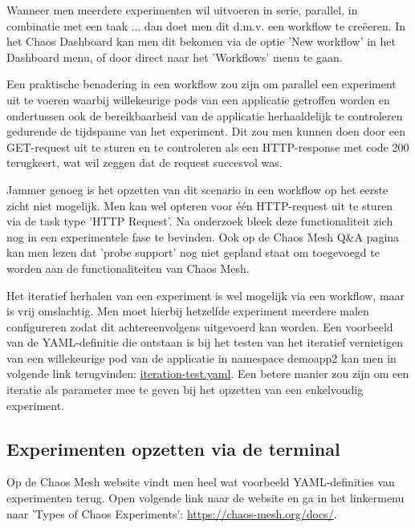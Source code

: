 Wanneer men meerdere experimenten wil uitvoeren in serie, parallel, in combinatie met een taak ... dan doet men dit d.m.v. een workflow te creëeren. In het Chaos Dashboard kan men dit bekomen via de optie 'New workflow' in het Dashboard menu, of door direct naar het 'Workflows' menu te gaan.

Een praktische benadering in een workflow zou zijn om parallel een experiment uit te voeren waarbij  willekeurige pods van een applicatie getroffen worden en ondertussen ook de bereikbaarheid van de applicatie herhaaldelijk te controleren gedurende de tijdspanne van het experiment. Dit zou men kunnen doen door een GET-request uit te sturen en te controleren als een HTTP-response met code 200 terugkeert, wat wil zeggen dat de request succesvol was. \autocite{MDN2022} 

Jammer genoeg is het opzetten van dit scenario in een workflow op het eerste zicht niet mogelijk. Men kan wel opteren voor één HTTP-request uit te sturen via de task type 'HTTP Request'. Na onderzoek bleek deze functionaliteit zich nog in een experimentele fase te bevinden. \autocite{ChaosMesh2022c}  
\newline Ook op de Chaos Mesh Q\&A pagina kan men lezen dat 'probe support' nog niet gepland staat om toegevoegd te worden aan de functionaliteiten van Chaos Mesh. \autocite{ChaosMesh2021}

Het iteratief herhalen van een experiment is wel mogelijk via een workflow, maar is vrij omslachtig. Men moet hierbij hetzelfde experiment meerdere malen configureren zodat dit achtereenvolgens uitgevoerd kan worden. Een voorbeeld van de YAML-definitie die ontstaan is bij het testen van het iteratief vernietigen van een willekeurige pod van de applicatie in namespace demoapp2 kan men in volgende link terugvinden: \href{https://github.com/KenBruggeman/BP_21-22/blob/master/bachelorproef/docs/chaosmesh-experimenten/iteration-test.yaml}{iteration-test.yaml}. \newline Een betere manier zou zijn om een iteratie als parameter mee te geven bij het opzetten van een enkelvoudig experiment. 

\subsection{Experimenten opzetten via de terminal}

Op de Chaos Mesh website vindt men heel wat voorbeeld YAML-definities van experimenten terug. Open volgende link naar de website en ga in het linkermenu naar 'Types of Chaos Experiments': \url{https://chaos-mesh.org/docs/}.

